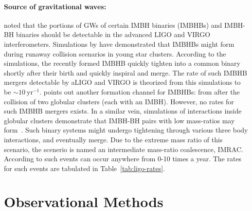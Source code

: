\paragraph{Source of gravitational waves:} 
\citet{abadie2010ratePredictions} noted that the portions of GWs of certain
IMBH binaries (IMBHBs) and IMBH-BH binaries should be detectable in
the advanced LIGO and VIRGO interferometers. Simulations by \citet{fregeau2006imbhbRatePrediction} have demonstrated
that IMBHBs might form during runaway collision scenarios in young
star clusters. According to the simulations, the recently formed
IMBHB quickly tighten into a common binary shortly after their birth
and quickly inspiral and merge. The rate of such IMBHB mergers
detectable by aLIGO and VIRGO is theorized from this simulations to
be $\sim10\ \text{yr}^{-1}$. \citet{abadie2010ratePredictions} points
out another formation channel for IMBHBs: from after the
collision of two globular clusters (each with an IMBH). However,
no rates for such IMBHB mergers exists. In a similar vein, simulations of interactions inside globular
clusters demonstrate that IMBH-BH pairs with low mass-ratios may
form~\cite{mandel2008rates}. Such binary systems might undergo
tightening through various three body interactions, and eventually
merge. Due to the extreme mass ratio of this scenario, the scenerio
is named an intermediate mass-ratio coalescence, IMRAC. According to \citet{mandel2008rates} such events can occur anywhere from 0-10 times a year. The rates for such events are tabulated in Table~\ref{tab:ligo-rates}.









\section{Observational Methods}

